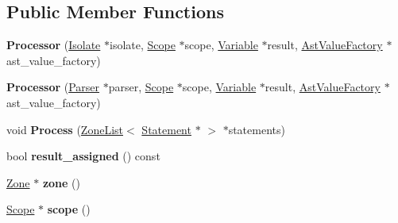 \subsection*{Public Member Functions}
\begin{DoxyCompactItemize}
\item 
{\bfseries Processor} (\hyperlink{classv8_1_1internal_1_1_isolate}{Isolate} $\ast$isolate, \hyperlink{classv8_1_1internal_1_1_scope}{Scope} $\ast$scope, \hyperlink{classv8_1_1internal_1_1_variable}{Variable} $\ast$result, \hyperlink{classv8_1_1internal_1_1_ast_value_factory}{Ast\+Value\+Factory} $\ast$ast\+\_\+value\+\_\+factory)\hypertarget{classv8_1_1internal_1_1_processor_a2c59ebc91c9e648c7562fc4aa8349c68}{}\label{classv8_1_1internal_1_1_processor_a2c59ebc91c9e648c7562fc4aa8349c68}

\item 
{\bfseries Processor} (\hyperlink{classv8_1_1internal_1_1_parser}{Parser} $\ast$parser, \hyperlink{classv8_1_1internal_1_1_scope}{Scope} $\ast$scope, \hyperlink{classv8_1_1internal_1_1_variable}{Variable} $\ast$result, \hyperlink{classv8_1_1internal_1_1_ast_value_factory}{Ast\+Value\+Factory} $\ast$ast\+\_\+value\+\_\+factory)\hypertarget{classv8_1_1internal_1_1_processor_a556447e479a9fda48d8179d67bc0c309}{}\label{classv8_1_1internal_1_1_processor_a556447e479a9fda48d8179d67bc0c309}

\item 
void {\bfseries Process} (\hyperlink{classv8_1_1internal_1_1_zone_list}{Zone\+List}$<$ \hyperlink{classv8_1_1internal_1_1_statement}{Statement} $\ast$ $>$ $\ast$statements)\hypertarget{classv8_1_1internal_1_1_processor_a741c174cc2b93af87ae5bfed3471cb24}{}\label{classv8_1_1internal_1_1_processor_a741c174cc2b93af87ae5bfed3471cb24}

\item 
bool {\bfseries result\+\_\+assigned} () const \hypertarget{classv8_1_1internal_1_1_processor_a3ed0da0296d8cae1005d74fc62e9d24d}{}\label{classv8_1_1internal_1_1_processor_a3ed0da0296d8cae1005d74fc62e9d24d}

\item 
\hyperlink{classv8_1_1internal_1_1_zone}{Zone} $\ast$ {\bfseries zone} ()\hypertarget{classv8_1_1internal_1_1_processor_ae0d85fa136ee8369529b7c9e4f26be62}{}\label{classv8_1_1internal_1_1_processor_ae0d85fa136ee8369529b7c9e4f26be62}

\item 
\hyperlink{classv8_1_1internal_1_1_scope}{Scope} $\ast$ {\bfseries scope} ()\hypertarget{classv8_1_1internal_1_1_processor_a2a4dac29e14e448709d8e2431b0dcd5c}{}\label{classv8_1_1internal_1_1_processor_a2a4dac29e14e448709d8e2431b0dcd5c}


\end{DoxyCompactItemize}
